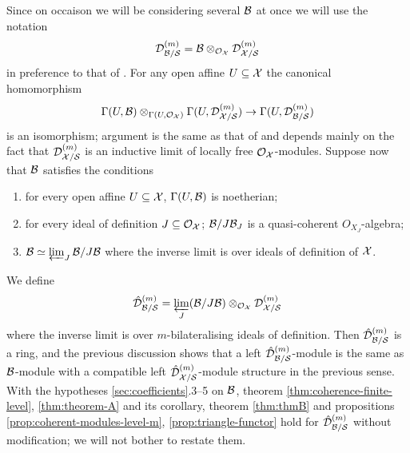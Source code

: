 \documentclass{article}
\theoremstyle{change}
\numberwithin{equation}{subsubsection}
\begin{document}
Since on occaison we will be considering
several ${\cal B}$ at once we will use the notation
\begin{equation}
  \label{eq:D-with-coefficients}
  {{\cal D}}^{({m})}_{{\cal B}/{\cal S}}={\cal B}\otimes_{{\cal O}_{\cal X}}{{\cal D}}^{({m})}_{{\cal X}/{\cal S}}
\end{equation}
in preference to that of \cite{berthelot:1996}. For any open affine
$U\subseteq{\cal X}$ the canonical homomorphism
\begin{equation}
  \label{eq:coefficient-ring}
  \Gamma(U,{\cal B})\otimes_{\Gamma(U,{\cal O}_{\cal X})}\Gamma(U,{{\cal D}}^{({m})}_{{\cal X}/{\cal S}})\to
  \Gamma(U,{{\cal D}}^{({m})}_{{\cal B}/{\cal S}})
\end{equation}
is an isomorphism; argument is the same as that of
\cite[Prop. 2.3.6]{berthelot:1996} and depends mainly on the fact that
${{\cal D}}^{({m})}_{{\cal X}/{\cal S}}$ is an inductive limit of locally free
${\cal O}_{\cal X}$-modules. Suppose now that ${\cal B}$ satisfies the conditions
\begin{enumerate}
\item for every open affine $U\subseteq{\cal X}$, $\Gamma(U,{\cal B})$ is
  noetherian;
\item for every ideal of definition $J\subseteq{\cal O}_{\cal X}$; ${\cal B}/J{\cal B}_J$ is a
  quasi-coherent $O_{X_J}$-algebra;
\item ${\cal B}\simeq\varprojlim_J{\cal B}/J{\cal B}$ where the inverse limit is over
  ideals of definition of ${\cal X}$.
\end{enumerate}
We define
\begin{equation}
  \label{eq:coefficient-ring-complete}
  {\hat{\cal D}}^{({m})}_{{\cal B}/{\cal S}}=\varprojlim_J({\cal B}/J{\cal B})
  \otimes_{{\cal O}_{\cal X}}{{\cal D}}^{({m})}_{{\cal X}/{\cal S}}
\end{equation}
where the inverse limit is over $m$-bilateralising ideals of
definition. Then ${\hat{\cal D}}^{({m})}_{{\cal B}/{\cal S}}$ is a ring, and the previous
discussion shows that a left ${\hat{\cal D}}^{({m})}_{{\cal B}/{\cal S}}$-module is the
same as ${\cal B}$-module with a compatible left
${\hat{\cal D}}^{({m})}_{{\cal X}/{\cal S}}$-module structure in the previous sense. With
the hypotheses \ref{sec:coefficients}.3--5 on ${\cal B}$, theorem
\ref{thm:coherence-finite-level}, \ref{thm:theorem-A} and its
corollary, theorem \ref{thm:thmB} and propositions
\ref{prop:coherent-modules-level-m}, \ref{prop:triangle-functor} hold
for ${\hat{\cal D}}^{({m})}_{{\cal B}/{\cal S}}$ without modification; we will not bother
to restate them.
\end{document}
